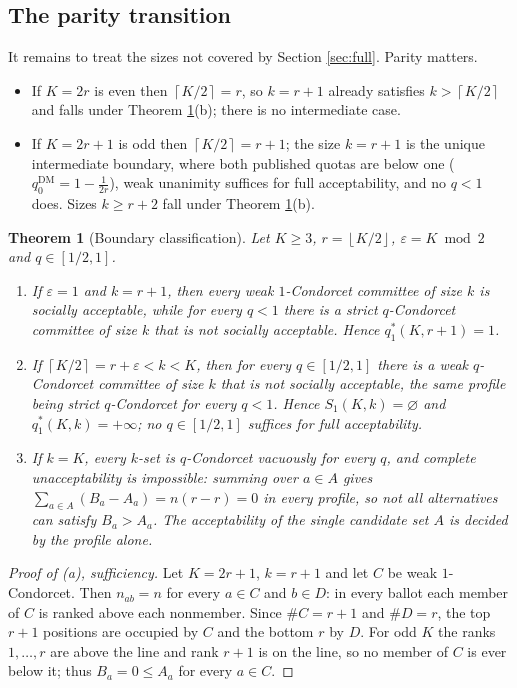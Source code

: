 \documentclass[11pt]{article}
\theoremstyle{plain}
\newtheorem{theorem}{Theorem}
\theoremstyle{definition}
\newcommand{\cl}[1]{\left\lceil #1\right\rceil}
\newcommand{\fl}[1]{\left\lfloor #1\right\rfloor}
\newcommand{\eps}{\varepsilon}
\newcommand{\DM}{\mathrm{DM}}
\begin{document}
\subsection{The parity transition}

It remains to treat the sizes not covered by Section \ref{sec:full}. Parity matters.

\begin{itemize}
\item If $K=2r$ is even then $\cl{K/2}=r$, so $k=r+1$ already satisfies $k>\cl{K/2}$ and falls under Theorem \ref{thm:boundary}(b); there is no intermediate case.
\item If $K=2r+1$ is odd then $\cl{K/2}=r+1$; the size $k=r+1$ is the unique intermediate boundary, where both published quotas are below one ($q_0^{\DM}=1-\frac{1}{2r}$), weak unanimity suffices for full acceptability, and no $q<1$ does. Sizes $k\ge r+2$ fall under Theorem \ref{thm:boundary}(b).
\end{itemize}

\begin{theorem}[Boundary classification]
\label{thm:boundary}
Let $K\ge3$, $r=\fl{K/2}$, $\eps=K\bmod2$ and $q\in[1/2,1]$.
\begin{enumerate}[label=(\alph*)]
\item If $\eps=1$ and $k=r+1$, then every weak $1$-Condorcet committee of size $k$ is socially acceptable, while for every $q<1$ there is a strict $q$-Condorcet committee of size $k$ that is not socially acceptable. Hence $q_1^*(K,r+1)=1$.
\item If $\cl{K/2}=r+\eps<k<K$, then for every $q\in[1/2,1]$ there is a weak $q$-Condorcet committee of size $k$ that is not socially acceptable, the same profile being strict $q$-Condorcet for every $q<1$. Hence $S_1(K,k)=\varnothing$ and $q_1^*(K,k)=+\infty$; no $q\in[1/2,1]$ suffices for full acceptability.
\item If $k=K$, every $k$-set is $q$-Condorcet vacuously for every $q$, and complete unacceptability is impossible: summing over $a\in A$ gives $\sum_{a\in A}(B_a-A_a)=n(r-r)=0$ in every profile, so not all alternatives can satisfy $B_a>A_a$. The acceptability of the single candidate set $A$ is decided by the profile alone.
\end{enumerate}
\end{theorem}

\begin{proof}[Proof of (a), sufficiency]
Let $K=2r+1$, $k=r+1$ and let $C$ be weak $1$-Condorcet. Then $n_{ab}=n$ for every $a\in C$ and $b\in D$: in every ballot each member of $C$ is ranked above each nonmember. Since $\#C=r+1$ and $\#D=r$, the top $r+1$ positions are occupied by $C$ and the bottom $r$ by $D$. For odd $K$ the ranks $1,\dots,r$ are above the line and rank $r+1$ is on the line, so no member of $C$ is ever below it; thus $B_a=0\le A_a$ for every $a\in C$.
\end{proof}
\end{document}
